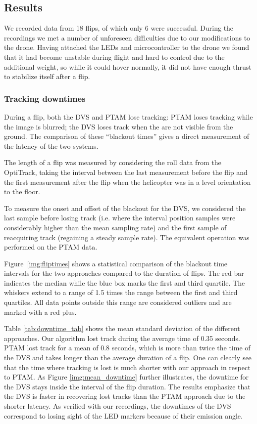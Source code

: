 \subsection{Results \label{sec:evaluation}}

We recorded data from 18 flips, of which only 6 were successful. During
the recordings we met a number of unforeseen difficulties due to our
modifications to the drone. Having attached the LEDs and microcontroller
to the drone we found that it had become unstable during flight and
hard to control due to the additional weight, so while it could hover
normally, it did not have enough thrust to stabilize itself after
a flip.




\subsubsection{Tracking downtimes\label{sec:trackingspeed}}

During a flip, both the DVS and PTAM lose tracking: PTAM loses tracking
while the image is blurred; the DVS loses track when the \ALMs are
not visible from the ground. The comparison of these ``blackout times''
gives a direct measurement of the latency of the two systems. 



The length of a flip was measured by considering the roll data from
the OptiTrack, taking the interval between the last measurement before
the flip and the first measurement after the flip when the helicopter
was in a level orientation to the floor. 

To measure the onset and offset of the blackout for the DVS, we considered
the last sample before losing track (i.e. where the interval position
samples were considerably higher than the mean sampling rate) and
the first sample of reacquiring track (regaining a steady sample rate).
The equivalent operation was performed on the PTAM data. 

Figure~\ref{img:fliptimes} shows a statistical comparison of the
blackout time intervals for the two approaches compared to the duration
of flips. The red bar indicates the median while the blue box marks
the first and third quartile. The whiskers extend to a range of 1.5
times the range between the first and third quartiles. All data points
outside this range are considered outliers and are marked with a red
plus.

Table \ref{tab:downtime_tab} shows the mean standard deviation of
the different approaches. Our algorithm lost track during the average
time of 0.35 seconds. PTAM lost track for a mean of 0.8 seconds, which
is more than twice the time of the DVS and takes longer than the average
duration of a flip. One can clearly see that the time where tracking
is lost is much shorter with our approach in respect to PTAM. As Figure
\ref{img:mean_downtime} further illustrates, the downtime for the
DVS stays inside the interval of the flip duration. The results emphasize
that the DVS is faster in recovering lost tracks than the PTAM approach
due to the shorter latency. As verified with our recordings, the downtimes
of the DVS correspond to losing sight of the LED markers because of
their emission angle. 

